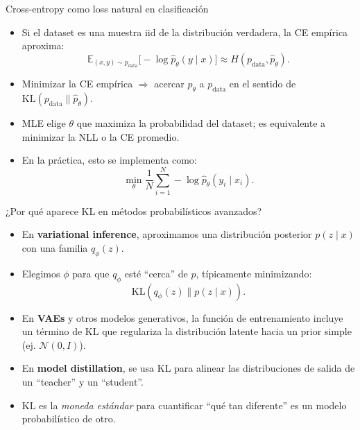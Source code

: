 \begin{frame}{Cross-entropy como loss natural en clasificación}
\begin{itemize}
  \item Si el dataset es una muestra iid de la distribución verdadera, la CE empírica aproxima:
  \[
    \mathbb{E}_{(x,y)\sim p_{\text{data}}}\big[-\log \hat p_\theta(y\mid x)\big]
    \approx H(p_{\text{data}},\hat p_\theta).
  \]
  \item Minimizar la CE empírica \(\Rightarrow\) acercar \(\hat p_\theta\) a \(p_{\text{data}}\) en el sentido de \(\mathrm{KL}(p_{\text{data}}\|\hat p_\theta)\).
  \item {} MLE elige \(\theta\) que maximiza la probabilidad del dataset; es equivalente a minimizar la NLL o la CE promedio.
  \item En la práctica, esto se implementa como:
  \[
    \min_\theta \frac{1}{N}\sum_{i=1}^N -\log \hat p_\theta(y_i\mid x_i).
  \]
\end{itemize}
\end{frame}

\begin{frame}{¿Por qué aparece KL en métodos probabilísticos avanzados?}
\begin{itemize}
  \item En \textbf{variational inference}, aproximamos una distribución posterior \(p(z\mid x)\) con una familia \(q_\phi(z)\).
  \item Elegimos \(\phi\) para que \(q_\phi\) esté “cerca” de \(p\), típicamente minimizando:
  \[
    \mathrm{KL}(q_\phi(z)\|p(z\mid x)).
  \]
  \item En \textbf{VAEs} y otros modelos generativos, la función de entrenamiento incluye un término de KL que regulariza la distribución latente hacia un prior simple (ej. \(\mathcal{N}(0,I)\)).
  \item En \textbf{model distillation}, se usa KL para alinear las distribuciones de salida de un “teacher” y un “student”.
  \item {} KL es la \emph{moneda estándar} para cuantificar “qué tan diferente” es un modelo probabilístico de otro.
\end{itemize}
\end{frame}


